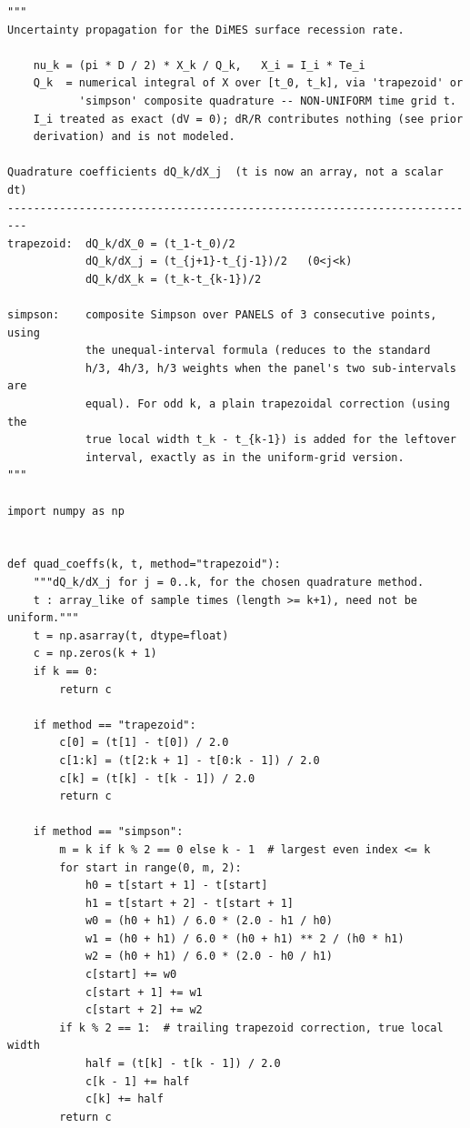\documentclass[11pt,twoside]{article}
\begin{document}
\begin{lstlisting}[caption={Example implementation of the recession rate calculation in Python}]
"""
Uncertainty propagation for the DiMES surface recession rate.

    nu_k = (pi * D / 2) * X_k / Q_k,   X_i = I_i * Te_i
    Q_k  = numerical integral of X over [t_0, t_k], via 'trapezoid' or
           'simpson' composite quadrature -- NON-UNIFORM time grid t.
    I_i treated as exact (dV = 0); dR/R contributes nothing (see prior
    derivation) and is not modeled.

Quadrature coefficients dQ_k/dX_j  (t is now an array, not a scalar dt)
-------------------------------------------------------------------------
trapezoid:  dQ_k/dX_0 = (t_1-t_0)/2
            dQ_k/dX_j = (t_{j+1}-t_{j-1})/2   (0<j<k)
            dQ_k/dX_k = (t_k-t_{k-1})/2

simpson:    composite Simpson over PANELS of 3 consecutive points, using
            the unequal-interval formula (reduces to the standard
            h/3, 4h/3, h/3 weights when the panel's two sub-intervals are
            equal). For odd k, a plain trapezoidal correction (using the
            true local width t_k - t_{k-1}) is added for the leftover
            interval, exactly as in the uniform-grid version.
"""

import numpy as np


def quad_coeffs(k, t, method="trapezoid"):
    """dQ_k/dX_j for j = 0..k, for the chosen quadrature method.
    t : array_like of sample times (length >= k+1), need not be uniform."""
    t = np.asarray(t, dtype=float)
    c = np.zeros(k + 1)
    if k == 0:
        return c

    if method == "trapezoid":
        c[0] = (t[1] - t[0]) / 2.0
        c[1:k] = (t[2:k + 1] - t[0:k - 1]) / 2.0
        c[k] = (t[k] - t[k - 1]) / 2.0
        return c

    if method == "simpson":
        m = k if k % 2 == 0 else k - 1  # largest even index <= k
        for start in range(0, m, 2):
            h0 = t[start + 1] - t[start]
            h1 = t[start + 2] - t[start + 1]
            w0 = (h0 + h1) / 6.0 * (2.0 - h1 / h0)
            w1 = (h0 + h1) / 6.0 * (h0 + h1) ** 2 / (h0 * h1)
            w2 = (h0 + h1) / 6.0 * (2.0 - h0 / h1)
            c[start] += w0
            c[start + 1] += w1
            c[start + 2] += w2
        if k % 2 == 1:  # trailing trapezoid correction, true local width
            half = (t[k] - t[k - 1]) / 2.0
            c[k - 1] += half
            c[k] += half
        return c


\end{lstlisting}
\end{document}
